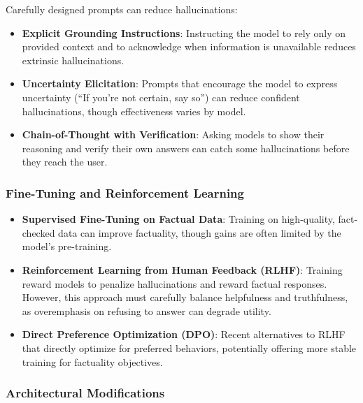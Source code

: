 Carefully designed prompts can reduce hallucinations:

\begin{itemize}
    \item \textbf{Explicit Grounding Instructions}: Instructing the model to rely only on provided context and to acknowledge when information is unavailable reduces extrinsic hallucinations.
    
    \item \textbf{Uncertainty Elicitation}: Prompts that encourage the model to express uncertainty (``If you're not certain, say so'') can reduce confident hallucinations, though effectiveness varies by model.
    
    \item \textbf{Chain-of-Thought with Verification}: Asking models to show their reasoning and verify their own answers can catch some hallucinations before they reach the user.
\end{itemize}

\subsubsection{Fine-Tuning and Reinforcement Learning}

\begin{itemize}
    \item \textbf{Supervised Fine-Tuning on Factual Data}: Training on high-quality, fact-checked data can improve factuality, though gains are often limited by the model's pre-training.
    
    \item \textbf{Reinforcement Learning from Human Feedback (RLHF)}: Training reward models to penalize hallucinations and reward factual responses. However, this approach must carefully balance helpfulness and truthfulness, as overemphasis on refusing to answer can degrade utility.
    
    \item \textbf{Direct Preference Optimization (DPO)}: Recent alternatives to RLHF that directly optimize for preferred behaviors, potentially offering more stable training for factuality objectives.
\end{itemize}

\subsubsection{Architectural Modifications}

